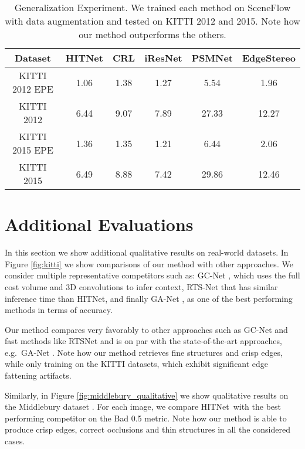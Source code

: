 \documentclass[final]{cvpr}
\newcommand{\algoname}{HITNet}
\begin{document}
\begin{table*}[htb]
    \centering
    \begin{tabular}{|c|c|c|c|c|c|}
    \hline
     Dataset & \algoname  & CRL \cite{pang2017cascade} & iResNet \cite{Liang2018Learning} & PSMNet \cite{chang2018pyramid} & EdgeStereo \cite{song2020edgestereo} \\
    \hline
    KITTI 2012 EPE & {1.06}   & {1.38} &1.27 & 5.54 & 1.96\\
    KITTI 2012   & 6.44  & 9.07& 7.89 & 27.33 & 12.27\\
    \hline
   KITTI 2015 EPE & {1.36} & {1.35} & 1.21 & 6.44 & 2.06\\
    KITTI 2015  & 6.49  & 8.88& 7.42 &29.86 & 12.46\\
    \hline
    \end{tabular}
    \caption{Generalization Experiment. We trained each method on SceneFlow with data augmentation and tested on KITTI 2012 and 2015. Note how our method outperforms the others.}
\label{tab:generaliz}
\vspace{-10pt}
\end{table*}


\section{Additional Evaluations}

In this section we show additional qualitative results on real-world datasets. In Figure \ref{fig:kitti} we show comparisons of our method with other approaches. We consider multiple representative competitors such as: GC-Net \cite{kendall2017end}, which uses the full cost volume and 3D convolutions to infer context, RTS-Net \cite{lee19} that has similar inference time than HITNet, and finally GA-Net \cite{Zhang2019GANet}, as one of the best performing methods in terms of accuracy.

Our method compares very favorably to other approaches such as GC-Net and fast methods like RTSNet and is on par with the state-of-the-art approaches, e.g.\ GA-Net \cite{Zhang2019GANet}. Note how our method retrieves fine structures and crisp edges, while only training on the KITTI datasets, which exhibit significant edge fattening artifacts.

Similarly, in Figure \ref{fig:middlebury_qualitative} we show qualitative results on the Middlebury dataset \cite{middlebury14}. For each image, we compare \algoname \ with the best performing competitor on the Bad 0.5 metric. Note how our method is able to produce crisp edges, correct occlusions and thin structures in all the considered cases.
\end{document}
